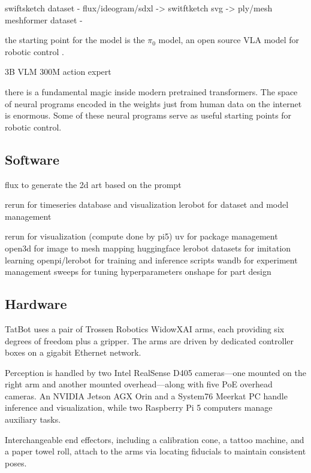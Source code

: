 \documentclass[11pt]{article}
\begin{document}
swiftsketch dataset - flux/ideogram/sdxl -> switftketch svg -> ply/mesh
meshformer dataset -

the starting point for the model is the $\pi_0$ model, an open source VLA model for robotic control \cite{Black2024pi0}.

3B VLM
300M action expert

there is a fundamental magic inside modern pretrained transformers.
The space of neural programs encoded in the weights just from human data on the internet is enormous. 
Some of these neural programs serve as useful starting points for robotic control.

\subsection{Software}

flux to generate the 2d art based on the prompt

rerun for timeseries database and visualization
lerobot for dataset and model management

rerun for visualization (compute done by pi5)
uv for package management
open3d for image to mesh mapping
huggingface lerobot datasets for imitation learning
openpi/lerobot for training and inference scripts
wandb for experiment management
sweeps for tuning hyperparameters
onshape for part design

\subsection{Hardware}

TatBot uses a pair of Trossen Robotics WidowXAI arms, each providing six degrees of freedom plus a gripper. The arms are driven by dedicated controller boxes on a gigabit Ethernet network.

Perception is handled by two Intel RealSense D405 cameras---one mounted on the right arm and another mounted overhead---along with five PoE overhead cameras. An NVIDIA Jetson AGX Orin and a System76 Meerkat PC handle inference and visualization, while two Raspberry Pi 5 computers manage auxiliary tasks.

Interchangeable end effectors, including a calibration cone, a tattoo machine, and a paper towel roll, attach to the arms via locating fiducials to maintain consistent poses.
\end{document}
